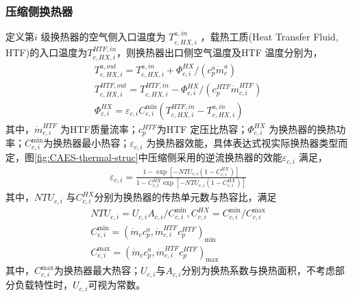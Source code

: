 \subsubsection{压缩侧换热器}
定义第$i$ 级换热器的空气侧入口温度为 $T_{c,HX,i}^{a,in}$ ，载热工质(Heat Transfer Fluid, HTF)的入口温度为$T_{c,HX,i}^{HTF,in}$，则换热器出口侧空气温度及HTF 温度分别为，
\begin{subequations}
\label{eq:he-comp-temp-out}
\begin{gather}
T_{c,HX,i}^{a,out} = T_{c,HX,i}^{a,in} + \Phi _{c,i}^{HX}/({c_p^a\dot m_c^a}) \label{equ:he-comp-temp-air-out} \\
T_{c,HX,i}^{HTF,out} = T_{c,HX,i}^{HTF,in} - \Phi _{c,i}^{HX}/({c_p^{HTF}\dot m_{c,i}^{HTF}}) \label{equ:he-comp-temp-HTF-out}\\
\Phi _{c,i}^{HX} = {\varepsilon _{c,i}}C_{c,i}^{\min }({T_{c,HX,i}^{HTF,in} - T_{c,HX,i}^{a,in}})\label{equ:he-comp-thermal}
\end{gather}
\end{subequations}
其中，$\dot m_{c,i}^{HTF}$ 为HTF质量流率；$c_p^{HTF}$为HTF 定压比热容；$\Phi _{c,i}^{HX}$ 为换热器的换热功率；$C_{c,i}^{\min}$为换热器最小热容；${\varepsilon _{c,i}}$ 为换热器效能，具体表达式视实际换热器类型而定，图\ref{fig:CAES-thermal-struc}中压缩侧采用的逆流换热器的效能${\varepsilon _{c,i}}$ 满足\cite{Heat-mass-transfer-11}，
\begin{subequations}
\begin{gather}
{\varepsilon _{c,i}} = \frac{{1 - \exp [{ - NT{U_{c,i}}({1 - C_{c,i}^{HX}})}]}}{{1 - C_{c,i}^{HX}\exp [{ - NT{U_{c,i}}({1 - C_{c,i}^{HX}})}]}}\label{equ:he-comp-eff-1}
\end{gather}
\end{subequations}
其中，$NT{U_{c,i}}$ 与$C_{c,i}^{HX}$分别为换热器的传热单元数与热容比，满足\cite{Heat-mass-transfer-11}
\begin{subequations}
\begin{gather}
NT{U_{c,i}} = U_{c,i}A_{c,i}/C_{c,i}^{\min }, C_{c,i}^{HX} = C_{c,i}^{\min }/C_{c,i}^{\max }\label{equ:he-comp-NTU-C}\\
C_{c,i}^{\min } = {({{{\dot m}_c}c_p^a,\dot m_{c,i}^{HTF}c_p^{HTF}})_{\min }}\label{equ:he-comp-Cmin}\\
C_{c,i}^{\max } = {({{{\dot m}_c}c_p^a,\dot m_{c,i}^{HTF}c_p^{HTF}})_{\max }}\label{equ:he-comp-Cmax}
\end{gather}
\end{subequations}
其中，$C_{c,i}^{\max }$为换热器最大热容；$U_{c,i}$与$A_{c,i}$分别为换热系数与换热面积，不考虑部分负载特性时，$U_{c,i}$可视为常数。

